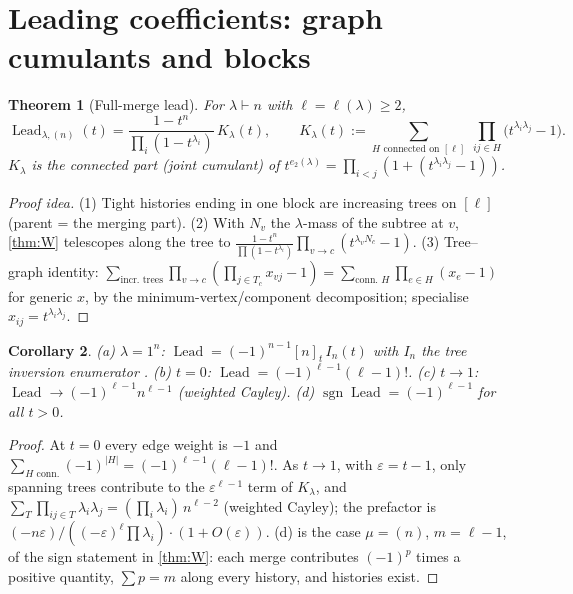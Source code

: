 \documentclass[submission]{FPSAC2027}
\newtheorem{theorem}{Theorem}[section]
\newtheorem{corollary}[theorem]{Corollary}
\theoremstyle{definition}
\theoremstyle{remark}
\newcommand{\Lead}{\operatorname{Lead}}
\begin{document}
\section{Leading coefficients: graph cumulants and blocks}\label{sec:leads}

\begin{theorem}[Full-merge lead]\label{thm:G}
For $\lambda\vdash n$ with $\ell=\ell(\lambda)\ge2$,
\[ \Lead_{\lambda,(n)}(t)=\frac{1-t^n}{\prod_i(1-t^{\lambda_i})}\,K_\lambda(t),\qquad K_\lambda(t):=\sum_{H\text{ connected on }[\ell]}\ \prod_{ij\in H}\bigl(t^{\lambda_i\lambda_j}-1\bigr). \]
$K_\lambda$ is the connected part (joint cumulant) of $t^{e_2(\lambda)}=\prod_{i<j}(1+(t^{\lambda_i\lambda_j}-1))$.
\end{theorem}
\begin{proof}[Proof idea]
(1) Tight histories ending in one block are increasing trees on $[\ell]$ (parent = the merging part). (2) With $N_v$ the $\lambda$-mass of the subtree at $v$, \cref{thm:W} telescopes along the tree to $\frac{1-t^n}{\prod(1-t^{\lambda_i})}\prod_{v\to c}(t^{\lambda_vN_c}-1)$. (3) Tree--graph identity: $\sum_{\text{incr.\ trees}}\prod_{v\to c}(\prod_{j\in T_c}x_{vj}-1)=\sum_{\text{conn.\ }H}\prod_{e\in H}(x_e-1)$ for generic $x$, by the minimum-vertex/component decomposition; specialise $x_{ij}=t^{\lambda_i\lambda_j}$.
\end{proof}
\begin{corollary}\label{cor:G}
(a) $\lambda=1^n$: $\Lead=(-1)^{n-1}[n]_t\,I_n(t)$ with $I_n$ the tree inversion enumerator \cite{MallowsRiordan68}. (b) $t=0$: $\Lead=(-1)^{\ell-1}(\ell-1)!$. (c) $t\to1$: $\Lead\to(-1)^{\ell-1}n^{\ell-1}$ (weighted Cayley). (d) $\operatorname{sgn}\Lead=(-1)^{\ell-1}$ for all $t>0$.
\end{corollary}
\begin{proof}
At $t=0$ every edge weight is $-1$ and $\sum_{H\text{ conn.}}(-1)^{|H|}=(-1)^{\ell-1}(\ell-1)!$. As $t\to1$, with $\varepsilon=t-1$, only spanning trees contribute to the $\varepsilon^{\ell-1}$ term of $K_\lambda$, and $\sum_T\prod_{ij\in T}\lambda_i\lambda_j=(\prod_i\lambda_i)\,n^{\ell-2}$ (weighted Cayley); the prefactor is $(-n\varepsilon)/((-\varepsilon)^\ell\prod\lambda_i)\cdot(1+O(\varepsilon))$. (d) is the case $\mu=(n)$, $m=\ell-1$, of the sign statement in \cref{thm:W}: each merge contributes $(-1)^p$ times a positive quantity, $\sum p=m$ along every history, and histories exist.
\end{proof}
\end{document}
